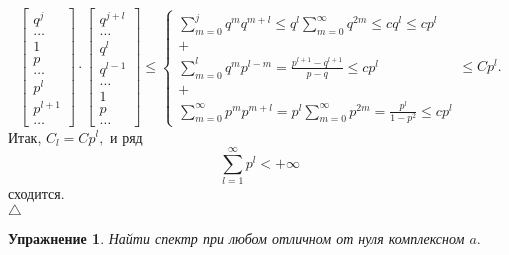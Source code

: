 \documentclass[12 pt, a4 paper]{article}
\theoremstyle{plain}   \newtheorem{Pro}{Задача}
\newtheorem{Exe}{Упражнение}
\begin{document}
\begin{equation*}
  \begin{bmatrix}
    q^j \\
	\dots \\
	1 \\
	p \\
	\dots \\
	p^l \\
	p^{l+1} \\
	\dots
  \end{bmatrix}
    \cdot
  \begin{bmatrix}
    q^{j+l} \\
	\dots \\
	q^l \\
	q^{l-1} \\
	\dots \\
	1 \\
	p \\
	\dots
  \end{bmatrix}
    \leq
  \begin{cases}
    \sum _{m=0}^j q^m q^{m+l} \leq
	q^l \sum_{m=0}^{\infty} q^{2m} \leq
	c q^l \leq cp^l \\
	+ \\
	 \sum _{m=0}^l q^m p^{l-m} =
	\frac{p^{l+1}-q^{l+1}}{p-q}
	\leq cp^l \\
	+ \\
	 \sum_{m=0}^{\infty} p^m p^{m+l} =
	p^l \sum_{m=0}^{\infty} p^{2m} =
	\frac{p^l}{1-p^2} \leq cp^l
  \end{cases}
    \leq Cp^l .
\end{equation*}
Итак,
$ C_l =Cp^l , $
и ряд
$$
  \sum_{l=1}^{\infty} p^l < +\infty
$$
сходится.
\\
$ \triangle $
\begin{Exe}
Найти спектр при любом отличном от нуля комплексном
$ a . $
\end{Exe}
\newpage
\end{document}
